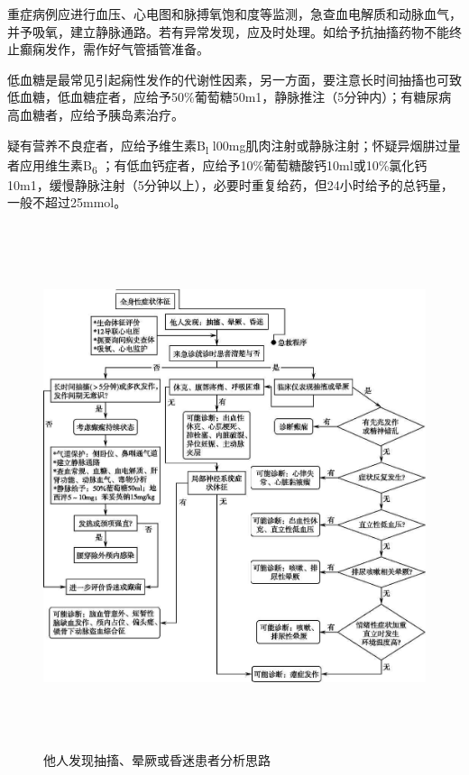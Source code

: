 重症病例应进行血压、心电图和脉搏氧饱和度等监测，急查血电解质和动脉血气，并予吸氧，建立静脉通路。若有异常发现，应及时处理。如给予抗抽搐药物不能终止癫痫发作，需作好气管插管准备。

低血糖是最常见引起痫性发作的代谢性因素，另一方面，要注意长时间抽搐也可致低血糖，低血糖症者，应给予50\%葡萄糖50m1，静脉推注（5分钟内）；有糖尿病高血糖者，应给予胰岛素治疗。

疑有营养不良症者，应给予维生素B\textsubscript{l}
l00mg肌肉注射或静脉注射；怀疑异烟肼过量者应用维生素B\textsubscript{6}
；有低血钙症者，应给予10\%葡萄糖酸钙10ml或10\%氯化钙10m1，缓慢静脉注射（5分钟以上），必要时重复给药，但24小时给予的总钙量，一般不超过25mmol。

\begin{figure}[!htbp]
 \centering
 \includegraphics[width=5.88542in,height=6.04167in]{./images/Image00034.jpg}
 \captionsetup{justification=centering}
 \caption{他人发现抽搐、晕厥或昏迷患者分析思路}
 \label{fig5-1}
  \end{figure} 

